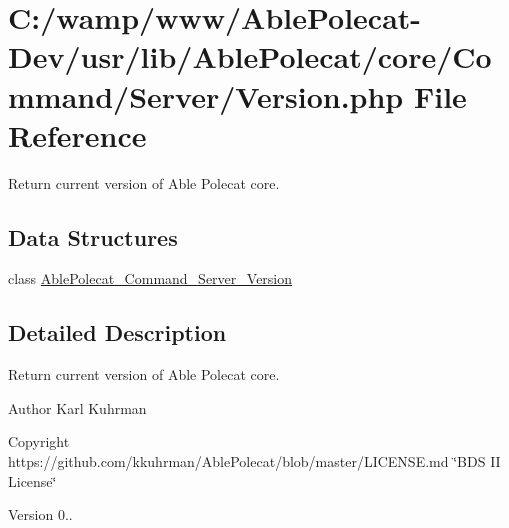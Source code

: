 \hypertarget{_command_2_server_2_version_8php}{}\section{C\+:/wamp/www/\+Able\+Polecat-\/\+Dev/usr/lib/\+Able\+Polecat/core/\+Command/\+Server/\+Version.php File Reference}
\label{_command_2_server_2_version_8php}


Return current version of Able Polecat core.  


\subsection*{Data Structures}
\begin{DoxyCompactItemize}
\item 
class \hyperlink{class_able_polecat___command___server___version}{Able\+Polecat\+\_\+\+Command\+\_\+\+Server\+\_\+\+Version}
\end{DoxyCompactItemize}


\subsection{Detailed Description}
Return current version of Able Polecat core. 

\begin{DoxyAuthor}{Author}
Karl Kuhrman 
\end{DoxyAuthor}
\begin{DoxyCopyright}{Copyright}
https\+://github.com/kkuhrman/\+Able\+Polecat/blob/master/\+L\+I\+C\+E\+N\+S\+E.\+md \char`\"{}\+B\+D\+S I\+I License\char`\"{} 
\end{DoxyCopyright}
\begin{DoxyVersion}{Version}
0.. 
\end{DoxyVersion}
